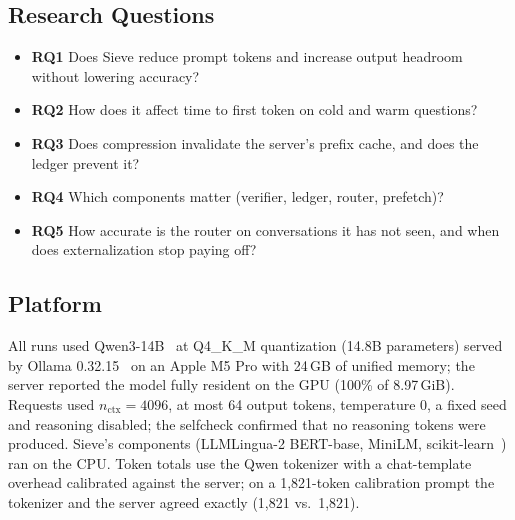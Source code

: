 \documentclass[journal]{IEEEtran}
\begin{document}
\subsection{Research Questions}
\begin{itemize}
\item \textbf{RQ1} Does Sieve reduce prompt tokens and increase output headroom without lowering accuracy?
\item \textbf{RQ2} How does it affect time to first token on cold and warm questions?
\item \textbf{RQ3} Does compression invalidate the server's prefix cache, and does the ledger prevent it?
\item \textbf{RQ4} Which components matter (verifier, ledger, router, prefetch)?
\item \textbf{RQ5} How accurate is the router on conversations it has not seen, and when does externalization stop paying off?
\end{itemize}

\subsection{Platform}
All runs used Qwen3-14B~\cite{qwen3} at Q4\_K\_M quantization (14.8B parameters) served by Ollama 0.32.15~\cite{ollama}
on an Apple M5 Pro with 24\,GB of unified memory; the server reported the model fully resident on the GPU (100\% of
8.97\,GiB). Requests used $n_\text{ctx}=4096$, at most 64 output tokens, temperature 0, a fixed seed and
reasoning disabled; the selfcheck confirmed that no reasoning tokens were produced. Sieve's components (LLMLingua-2 BERT-base,
MiniLM, scikit-learn~\cite{pedregosa2011sklearn}) ran on the CPU. Token totals use the Qwen tokenizer with a chat-template overhead
calibrated against the server; on a 1,821-token calibration prompt the tokenizer and the server agreed exactly
(1,821 vs.\ 1,821).
\end{document}
